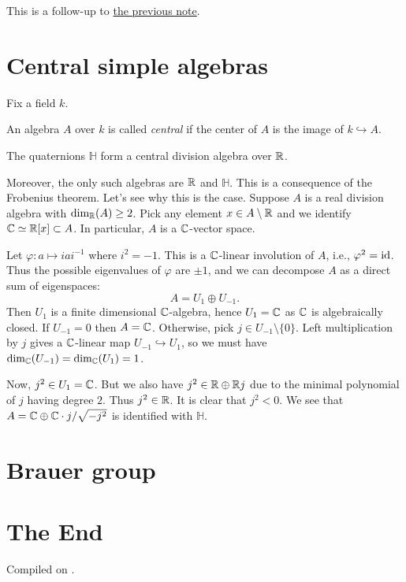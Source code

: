 \documentclass{article}
\begin{document}
\self

This is a follow-up to \href{https://caelestia.github.io/2025/0603.pdf}{the previous note}.

\section{Central simple algebras}

Fix a field $k$.

\begin{definition}
    An algebra $A$ over $k$ is called \emph{central} if the center of $A$ is the image of $k\hookrightarrow A$.
\end{definition}

\begin{example}
    The quaternions $\mathbb{H}$ form a central division algebra over $\mathbb{R}$.
    
    Moreover, the only such algebras are $\mathbb{R}$ and $\mathbb{H}$. This is a consequence of the Frobenius theorem. Let's see why this is the case. Suppose $A$ is a real division algebra with $\dim_{\mathbb{R}}(A)\geq 2$. Pick any element $x\in A\setminus \mathbb{R}$ and we identify $\mathbb{C}\simeq \mathbb{R}[x]\subset A$. In particular, $A$ is a $\mathbb{C}$-vector space.

    Let $\varphi:a\mapsto iai^{-1}$ where $i^2=-1$. This is a $\mathbb{C}$-linear involution of $A$, i.e., $\varphi^2=\mathrm{id}$. Thus the possible eigenvalues of $\varphi$ are $\pm 1$, and we can decompose $A$ as a direct sum of eigenspaces:
    \begin{equation*}
        A = U_1\oplus U_{-1}.
    \end{equation*}
    Then $U_1$ is a finite dimensional $\mathbb{C}$-algebra, hence $U_1=\mathbb{C}$ as $\mathbb{C}$ is algebraically closed. If $U_{-1}=0$ then $A=\mathbb{C}$. Otherwise, pick $j\in U_{-1}\setminus\{0\}$. Left multiplication by $j$ gives a $\mathbb{C}$-linear map $U_{-1}\hookrightarrow U_{1}$, so we must have $\dim_{\mathbb{C}}(U_{-1})=\dim_{\mathbb{C}}(U_{1})=1$.

    Now, $j^2\in U_1=\mathbb{C}$. But we also have $j^2\in \mathbb{R}\oplus\mathbb{R} j$ due to the minimal polynomial of $j$ having degree $2$. Thus $j^2\in\mathbb{R}$. It is clear that $j^2<0$. We see that $A=\mathbb{C}\oplus\mathbb{C}\cdot j/\sqrt{-j^2}$ is identified with $\mathbb{H}$.
\end{example}



\section{Brauer group}




\section*{The End}



\noindent Compiled on \todayymd.

\noindent\home
\end{document}

